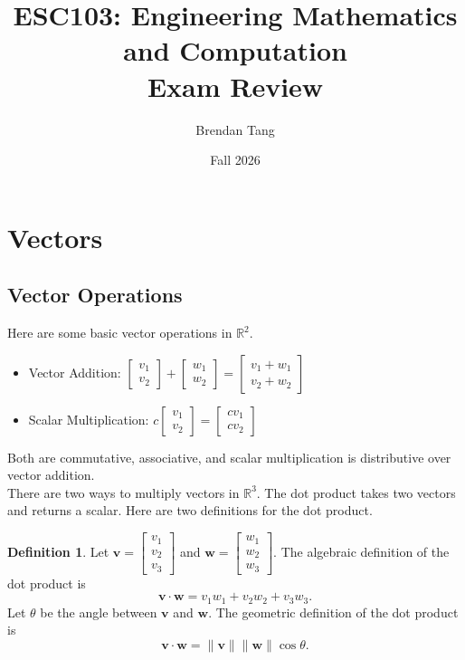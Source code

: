 \documentclass[11pt]{scrartcl}
\title{ESC103: Engineering Mathematics and Computation \\[0.1in] Exam Review}
\author{Brendan Tang}
\date{Fall 2026}
\theoremstyle{plain}
\theoremstyle{definition}
\newtheorem*{definition}{Definition}
\theoremstyle{remark}
\begin{document}
\maketitle
\thispagestyle{empty}

\tableofcontents

\newpage
\section{Vectors}
\subsection{Vector Operations}

Here are some basic vector operations in $\mathbb{R}^{2}$. 

\begin{itemize}
    \item Vector Addition: $\begin{bmatrix}v_{1} \\ v_{2}\end{bmatrix}+\begin{bmatrix} w_{1} \\ w_{2}
    \end{bmatrix} = \begin{bmatrix}v_{1}+w_{1} \\ v_{2}+w_{2}\end{bmatrix}$
    \item Scalar Multiplication: $c\begin{bmatrix}v_{1} \\ v_{2}\end{bmatrix}=\begin{bmatrix}cv_{1} \\ cv_{2}
    \end{bmatrix}$
\end{itemize}

Both are commutative, associative, and scalar multiplication is distributive over vector addition. \\

There are two ways to multiply vectors in $\mathbb{R}^{3}$. The dot product takes two vectors and returns a scalar. 
Here are two definitions for the dot product.

\begin{definition}
    Let $\mathbf{v}=\begin{bmatrix}v_{1} \\ v_{2} \\ v_{3}\end{bmatrix}$ and $\mathbf{w}=\begin{bmatrix}w_{1} \\ 
    w_{2} \\ w_{3}\end{bmatrix}$. The algebraic definition of the dot product is
    \[ \mathbf{v}\cdot \mathbf{w}=v_{1}w_{1}+v_{2}w_{2}+v_{3}w_{3}. \]
    Let $\theta$ be the angle between $\mathbf{v}$ and $\mathbf{w}$. The geometric definition of the dot product is 
    \[ \mathbf{v}\cdot \mathbf{w}=\lVert \mathbf{v} \rVert \lVert \mathbf{w} \rVert \cos \theta. \]
\end{definition}
\end{document}

